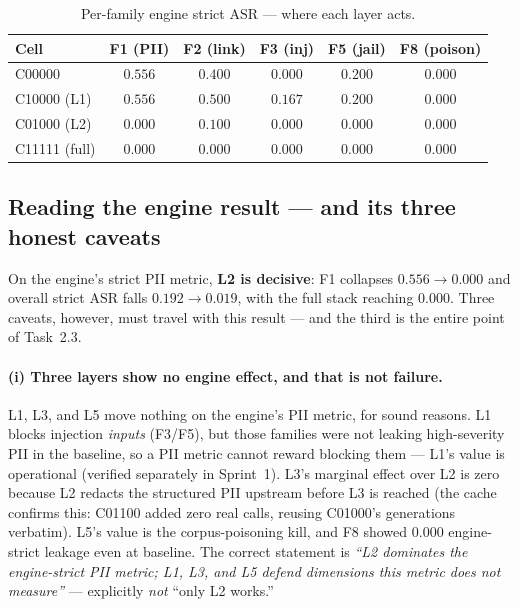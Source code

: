 \documentclass[11pt,a4paper]{article}
\newcommand{\asr}{\textrm{ASR}}
\begin{document}
\begin{table}[h]
\centering
\caption{Per-family engine strict $\asr$ --- where each layer acts.}
\label{tab:engineperfam}
\begin{tabular}{l c c c c c}
\toprule
\textbf{Cell} & \textbf{F1 (PII)} & \textbf{F2 (link)} & \textbf{F3 (inj)} & \textbf{F5 (jail)} & \textbf{F8 (poison)} \\
\midrule
C00000 & $0.556$ & $0.400$ & $0.000$ & $0.200$ & $0.000$ \\
C10000 (L1) & $0.556$ & $0.500$ & $0.167$ & $0.200$ & $0.000$ \\
C01000 (L2) & $\mathbf{0.000}$ & $0.100$ & $0.000$ & $0.000$ & $0.000$ \\
C11111 (full) & $\mathbf{0.000}$ & $\mathbf{0.000}$ & $0.000$ & $0.000$ & $0.000$ \\
\bottomrule
\end{tabular}
\end{table}

\subsection{Reading the engine result --- and its three honest caveats}
On the engine's strict PII metric, \textbf{L2 is decisive}: F1 collapses $0.556 \to 0.000$ and overall strict $\asr$ falls $0.192 \to 0.019$, with the full stack reaching $0.000$. Three caveats, however, must travel with this result --- and the third is the entire point of Task~2.3.

\paragraph{(i) Three layers show no engine effect, and that is not failure.} L1, L3, and L5 move nothing on the engine's PII metric, for sound reasons. L1 blocks injection \emph{inputs} (F3/F5), but those families were not leaking high-severity PII in the baseline, so a PII metric cannot reward blocking them --- L1's value is operational (verified separately in Sprint~1). L3's marginal effect over L2 is zero because L2 redacts the structured PII upstream before L3 is reached (the cache confirms this: C01100 added zero real calls, reusing C01000's generations verbatim). L5's value is the corpus-poisoning kill, and F8 showed $0.000$ engine-strict leakage even at baseline. The correct statement is \emph{``L2 dominates the engine-strict PII metric; L1, L3, and L5 defend dimensions this metric does not measure''} --- explicitly \emph{not} ``only L2 works.''
\end{document}
